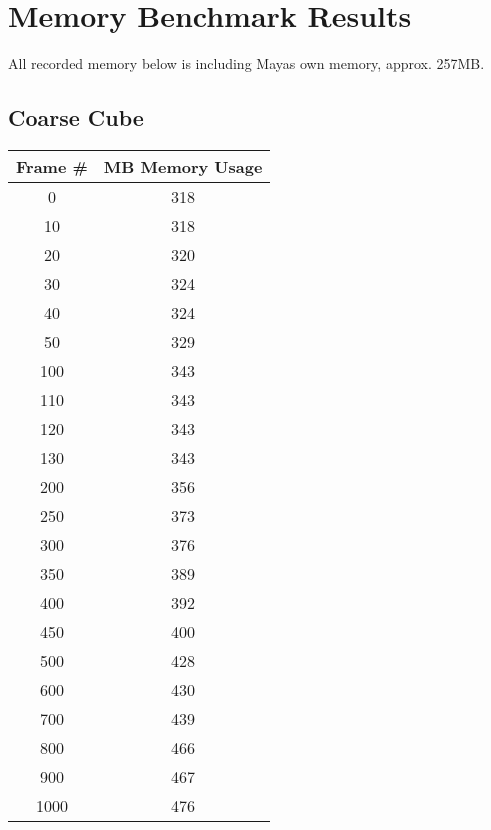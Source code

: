 \section{Memory Benchmark Results}
\label{sec:benchmarks}

All recorded memory below is including Mayas own memory, approx. 257MB.

\subsection{Coarse Cube}
\begin{tabular}{| c | c |}
\hline
\textbf{Frame \#} & \textbf{MB Memory Usage}\\\hline
0 & 318\\
10 & 318\\
20 & 320\\
30 & 324\\
40 & 324\\
50 & 329\\
100 & 343\\
110 & 343\\
120 & 343\\
130 & 343\\
200 & 356\\
250 & 373\\
300 & 376\\
350 & 389\\
400 & 392\\
450 & 400\\
500 & 428\\
600 & 430\\
700 & 439\\
800 & 466\\
900 & 467\\
1000 & 476\\\hline
\end{tabular}

